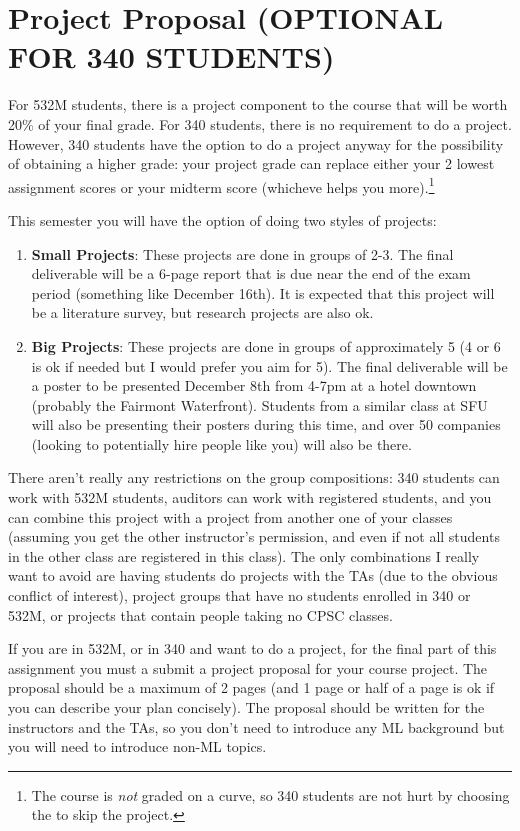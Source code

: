 \documentclass{article}
\def\blu#1{{\color{blu}#1}}
\def\enum#1{\begin{enumerate}#1\end{enumerate}}
\begin{document}
\section*{Project Proposal (OPTIONAL FOR 340 STUDENTS)}

For 532M students, there is a project component to the course that will be worth 20\% of your final grade. For 340 students, there is no requirement to do a project. However, 340 students have the option to do a project anyway for the possibility of obtaining a higher grade: your project grade can replace either your 2 lowest assignment scores or your midterm score (whicheve helps you more).\footnote{The course is \emph{not} graded on a curve, so 340 students are not hurt by choosing the to skip the project.}

This semester you will have the option of doing two styles of projects:
\enum{
\item \textbf{Small Projects}: These projects are done in \blu{groups of 2-3}. The final deliverable will be a \blu{6-page report that is due near the end of the exam period} (something like December 16th). It is expected that this project will be a literature survey, but research projects are also ok.
\item \textbf{Big Projects}: These projects are done in \blu{groups of approximately 5} (4 or 6 is ok if needed but I would prefer you aim for 5). The final deliverable will be a \blu{poster to be presented December 8th} from 4-7pm at a hotel downtown (probably the Fairmont Waterfront). Students from a similar class at SFU will also be presenting their posters during this time, and over 50 companies (looking to potentially hire people like you) will also be there.
}
There aren't really any restrictions on the group compositions: 340 students can work with 532M students, auditors can work with registered students, and you can combine this project with a project from another one of your classes (assuming you get the other instructor's permission, and even if not all students in the other class are registered in this class). The only combinations I really want to avoid are having students do projects with the TAs (due to the obvious conflict of interest), project groups that have no students enrolled in 340 or 532M, or projects that contain people taking no CPSC classes.

If you are in 532M, or in 340 and want to do a project, for the final part of this assignment you must a \blu{submit a project proposal} for your course project. The proposal should be a maximum of 2 pages (and 1 page or half of a page is ok if you can describe your plan concisely). The proposal should be written for the instructors and the TAs, so you don't need to introduce any ML background but you will need to introduce non-ML topics. 
\end{document}

